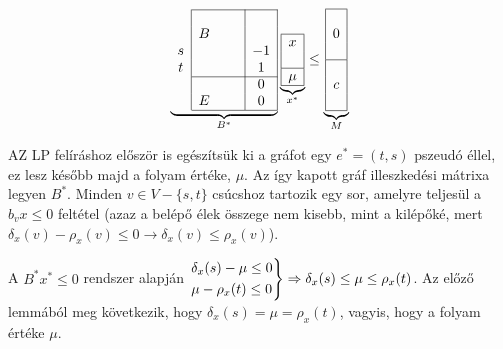 \begin{wrapfigure}{L}{0.35\textwidth}
  \begin{center}
    \vspace{-1.3cm}
\begin{displaymath}
\underbrace{
\begin{array}{c|ccc|c|}
\cline{2-5}
   &   & & & \\
   &  B& & & \\
 s &   & & &-1 \\
 t &   & & & 1 \\ 
 \cline{2-5}
   &   & & & 0 \\
   & E & & & 0 \\
\cline{2-5}
\end{array}}_{B^*}
\underbrace{
\begin{array}{|c|}
\hline
x\\
\\
\hline
\mu\\
\hline
\end{array}}_{x^*}
\leq
\underbrace{
\begin{array}{|c|}
\hline
\\
0\\
\\
\hline
\\
c\\
\\
\hline
\end{array}}_{M}
\end{displaymath}
  \vspace{-1.3cm}
  \end{center}
\end{wrapfigure}

AZ LP felíráshoz először is egészítsük ki a gráfot egy $e^*=(t,s)$ pszeudó éllel, ez lesz 
később majd a folyam értéke, $\mu$. Az így kapott gráf illeszkedési mátrixa legyen $B^*$.
Minden $v \in V - \{s,t\}$ csúcshoz tartozik egy sor, amelyre teljesül a $b_vx\leq 0$ feltétel 
(azaz a belépő élek összege nem kisebb, mint a kilépőké, mert $\delta_x(v) - \rho_x(v) \leq 
0 \rightarrow \delta_x(v) \leq \rho_x(v)$). 

A $B^*x^* \leq 0$ rendszer alapján $\begin{rcases} \delta_x(s)-\mu \leq 0 \\
\mu - \rho_x(t) \leq 0 \end{rcases} \Rightarrow \delta_x(s) \leq \mu \leq
\rho_x(t)$. Az előző lemmából meg következik, hogy $\delta_x(s)=\mu=\rho_x(t)$, 
vagyis, hogy a folyam értéke $\mu$. 

